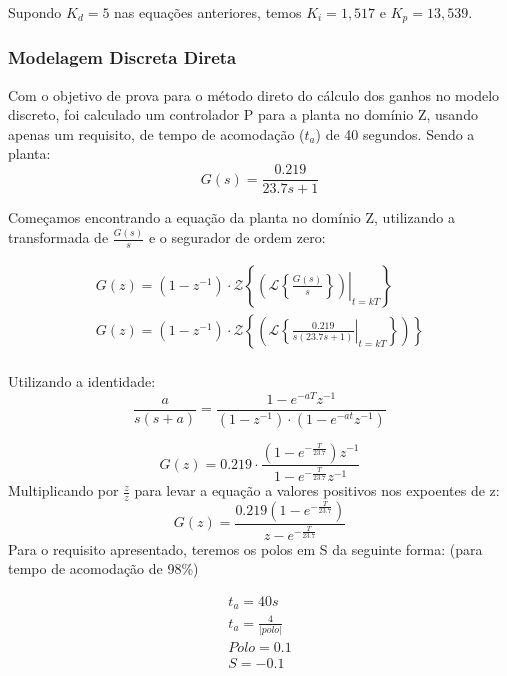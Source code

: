 \documentclass[
	article,			%
	11pt,				%
	oneside,			%
	a4paper,			%
	section=TITLE,		%
	english,			%
	brazil,				%
	sumario=tradicional
	]{abntex2}
\begin{document}
Supondo $K_d = 5$ nas equações anteriores, temos $K_i = 1,517$ e $K_p = 13,539$.
\subsubsection{Modelagem Discreta Direta}
Com o objetivo de prova para o método direto do cálculo dos ganhos no modelo discreto, foi calculado um controlador P para a planta no domínio Z, usando apenas um requisito, de tempo de acomodação ($t_a$) de 40 segundos. Sendo a planta:
\begin{equation}
   G(s) = \frac{0.219}{23.7 s + 1} 
\end{equation}

Começamos encontrando a equação da planta no domínio Z, utilizando a transformada de $\frac{G(s)}{s}$ e o segurador de ordem zero:

\begin{equation} 
\begin{split}
    G(z) = (1-z^{-1}) \cdot \mathcal{Z} \left\{ \left. \left( \mathcal{L} \left\{ \frac{G(s)}{s} \right\} \right) \right| _{t=kT} \right\} \\
    G(z) = (1-z^{-1}) \cdot \mathcal{Z} \left\{ \left. \left( \mathcal{L} \left\{ \frac{0.219}{s(23.7 s + 1)} \right| _{t=kT} \right\} \right)  \right\} \\
\end{split}
\end{equation}

Utilizando a identidade:
\[ \frac{a}{s(s+a)} = \frac{1-e^{-aT} z^{-1}}{(1 - z^{-1})\cdot(1-e^{-at}z^{-1})} \]

\begin{equation} 
    G(z) = 0.219 \cdot \frac{(1-e^{-\frac{T}{23.7}})z^{-1}}{1-e^{-\frac{T}{23.7}}z^{-1}}
\end{equation}
Multiplicando por $\frac{z}{z}$ para levar a equação a valores positivos nos expoentes de z:
\begin{equation} 
    G(z) =  \frac{0.219(1-e^{-\frac{T}{23.7}})} {z-e^{-\frac{T}{23.7}}}
\end{equation}
Para o requisito apresentado, teremos os polos em S da seguinte forma: (para tempo de acomodação de 98\%)

\begin{equation}
\begin{split}
    t_a=40s \\
    t_a=\frac{4}{|polo|} \\
    Polo = 0.1 \\
    S = -0.1 \\
\end{split}
\end{equation}
\end{document}
